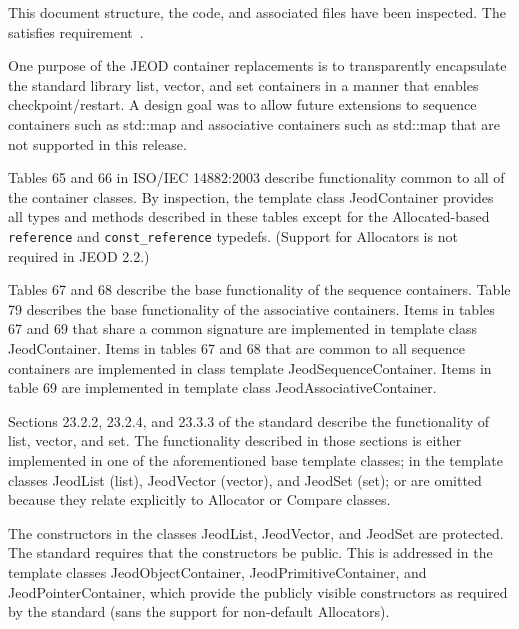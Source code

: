 %
% 

\label{inspect:TLI}

This document structure, the code, and associated files have been inspected.
The \ModelDesc satisfies requirement~.

\label{inspect:STL}

One  purpose of the JEOD container replacements is to transparently
encapsulate the \Cplusplus standard library list, vector, and set containers
in a manner that enables checkpoint/restart.
A design goal was to allow future extensions to
sequence containers such as std::map and
associative containers such as std::map
that are not supported in this release.

Tables 65 and 66 in ISO/IEC 14882:2003\cite{cpp2003} describe functionality
common to all of the container classes. By inspection, the template class
JeodContainer provides all types and methods described in these tables except
for the Allocated-based \verb|reference| and \verb|const_reference| typedefs.
(Support for Allocators is not required in JEOD 2.2.)

Tables 67 and 68 describe the base functionality of the sequence containers.
Table 79 describes the base functionality of the associative containers.
Items in tables 67 and 69 that share a common signature are implemented in
template class JeodContainer. Items in tables 67 and 68 that are common to all
sequence containers are implemented in class template JeodSequenceContainer.
Items in table 69 are implemented in template class JeodAssociativeContainer.

Sections 23.2.2, 23.2.4, and 23.3.3 of the \Cplusplus standard describe the
functionality of list, vector, and set.
The functionality described in those sections is either implemented in one of the
aforementioned base template classes; in the
template classes JeodList (list), JeodVector (vector), and JeodSet (set);
or are omitted because they relate explicitly to Allocator or Compare classes.

The constructors in the classes JeodList, JeodVector, and JeodSet are protected.
The standard requires that the constructors be public.
This is addressed in the template classes
JeodObjectContainer, JeodPrimitiveContainer, and JeodPointerContainer,
which provide the publicly visible constructors as required by the standard
(sans the support for non-default Allocators).

